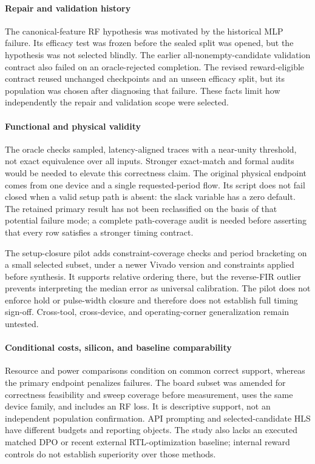 \paragraph{Repair and validation history}
The canonical-feature RF hypothesis was motivated by the historical MLP
failure.  Its efficacy test was frozen before the sealed split was opened,
but the hypothesis was not selected blindly.  The earlier all-nonempty-candidate
validation contract also failed on an oracle-rejected completion.  The revised
reward-eligible contract reused unchanged checkpoints and an unseen efficacy
split, but its population was chosen after diagnosing that failure.  These
facts limit how independently the repair and validation scope were selected.

\paragraph{Functional and physical validity}
The oracle checks sampled, latency-aligned traces with a near-unity threshold,
not exact equivalence over all inputs.  Stronger exact-match and formal audits
would be needed to elevate this correctness claim.  The original physical
endpoint comes from one device and a single requested-period flow.  Its script
does not fail closed when a valid setup path is absent: the slack variable has
a zero default.  The retained primary result has not been reclassified on the
basis of that potential failure mode; a complete path-coverage audit is needed
before asserting that every row satisfies a stronger timing contract.

The setup-closure pilot adds constraint-coverage checks and period bracketing
on a small selected subset, under a newer Vivado version and constraints applied
before synthesis.  It supports relative ordering there, but the reverse-FIR
outlier prevents interpreting the median error as universal calibration.
The pilot does not enforce hold or pulse-width closure and therefore does not
establish full timing sign-off.  Cross-tool, cross-device, and operating-corner
generalization remain untested.

\paragraph{Conditional costs, silicon, and baseline comparability}
Resource and power comparisons condition on common correct support, whereas
the primary endpoint penalizes failures.  The board subset was amended for
correctness feasibility and sweep coverage before measurement, uses the same
device family, and includes an RF loss.  It is descriptive support, not an
independent population confirmation.  API prompting and selected-candidate
HLS have different budgets and reporting objects.  The study also lacks an
executed matched DPO or recent external RTL-optimization baseline; internal
reward controls do not establish superiority over those methods.

